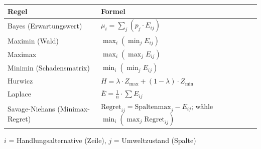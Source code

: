 
\begin{center}
\begin{tabular}{@{}lp{9.5cm}@{}}
	\toprule
	\textbf{Regel} & \textbf{Formel} \\
	\midrule
	Bayes (Erwartungswert) & $\mu_i = \sum_j (p_j \cdot E_{ij})$ \\
	Maximin (Wald) & $\max_i(\min_j E_{ij})$ \\
	Maximax & $\max_i(\max_j E_{ij})$ \\
	Minimin (Schadensmatrix) & $\min_i(\min_j E_{ij})$ \\
	Hurwicz & $H = \lambda \cdot Z_{\max} + (1-\lambda) \cdot Z_{\min}$ \\
	Laplace & $\bar{E} = \frac{1}{n} \cdot \sum E_{ij}$ \\
	Savage-Niehans (Minimax-Regret) & $\text{Regret}_{ij} = \text{Spaltenmax}_j - E_{ij}$; wähle $\min_i(\max_j \text{Regret}_{ij})$ \\
	\bottomrule
\end{tabular}

$i$ = Handlungsalternative (Zeile), $j$ = Umweltzustand (Spalte)
\end{center}

